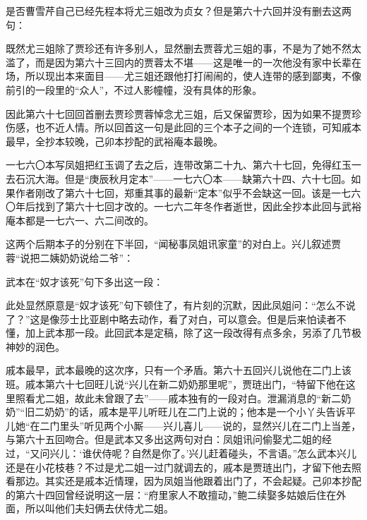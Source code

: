 \par 是否曹雪芹自己已经先程本将尤三姐改为贞女？但是第六十六回并没有删去这两句：
\par 既然尤三姐除了贾珍还有许多别人，显然删去贾蓉尤三姐的事，不是为了她不然太滥了，而是因为第六十三回内的贾蓉太不堪——这是唯一的一次他没有家中长辈在场，所以现出本来面目——尤三姐还跟他打打闹闹的，使人连带的感到鄙夷，不像前引的一段里的“众人”，不过人影幢幢，没有具体的形象。
\par 因此第六十七回回首删去贾珍贾蓉悼念尤三姐，后又保留贾珍，因为如果不提贾珍伤感，也不近人情。所以回首这一句是此回的三个本子之间的一个连锁，可知戚本最早，全抄本较晚，己卯本抄配的武裕庵本最晚。
\par 一七六〇本写凤姐把红玉调了去之后，连带改第二十九、第六十七回，免得红玉一去石沉大海。但是“庚辰秋月定本”——一七六〇本——缺第六十四、六十七回。如果作者刚改了第六十七回，郑重其事的最新“定本”似乎不会缺这一回。该是一七六〇年后找到了第六十七回才改的。一七六二年冬作者逝世，因此全抄本此回与武裕庵本都是一七六一、六二间改的。
\par 这两个后期本子的分别在下半回，“闻秘事凤姐讯家童”的对白上。兴儿叙述贾蓉“说把二姨奶奶说给二爷”：
\par 武本在“奴才该死”句下多出这一段：
\par 此处显然原意是“奴才该死”句下顿住了，有片刻的沉默，因此凤姐问：“怎么不说了？”这是像莎士比亚剧中略去动作，看了对白，可以意会。但是后来怕读者不懂，加上武本那一段。此回武本是定稿，除了这一段改得有点多余，另添了几节极神妙的润色。
\par 戚本最早，武本最晚的这次序，只有一个矛盾。第六十五回兴儿说他在二门上该班。戚本第六十七回旺儿说“兴儿在新二奶奶那里呢”，贾琏出门，“特留下他在这里照看尤二姐，故此未曾跟了去”——戚本独有的一段对白。泄漏消息的“新二奶奶”“旧二奶奶”的话，戚本是平儿听旺儿在二门上说的；他本是一个小丫头告诉平儿她“在二门里头”听见两个小厮——兴儿喜儿——说的，显然兴儿在二门上当差，与第六十五回吻合。但是武本又多出这两句对白：凤姐讯问偷娶尤二姐的经过，“又问兴儿：‘谁伏侍呢？自然是你了。’兴儿赶着碰头，不言语。”怎么武本兴儿还是在小花枝巷？不过是尤二姐一过门就调去的，戚本是贾琏出门，才留下他去照看那边。其实还是戚本近情理，因为凤姐当他跟着出门了，不会起疑。己卯本抄配的第六十四回曾经说明这一层：“府里家人不敢擅动，”鲍二续娶多姑娘后住在外面，所以叫他们夫妇俩去伏侍尤二姐。

